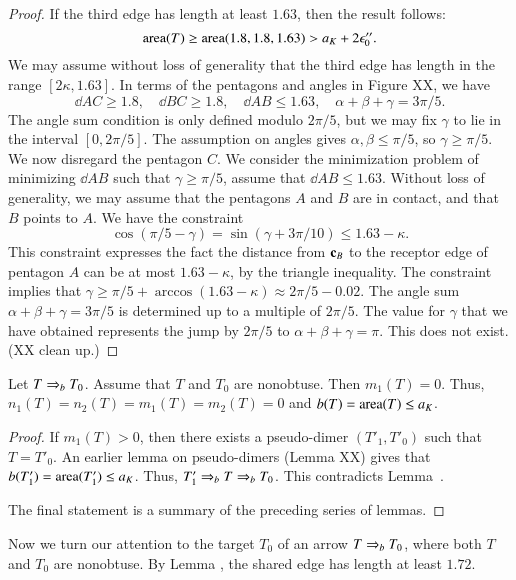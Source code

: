 \begin{proof}  If the third edge has length at least $1.63$, then the result follows:
\[
{\operatorname{area}}(T) \ge {\operatorname{area}}(1.8,1.8,1.63) > a_K + 2\epsilon_0''.
\]
We may assume without loss of generality that the third edge has length in the range $[2\kappa,1.63]$.
In terms of the pentagons and angles in Figure XX, we have
\[
\dd{A}{C}\ge 1.8,\quad \dd{B}{C}\ge 1.8,\quad \dd{A}{B}\le 1.63,\quad \alpha+\beta+\gamma=3\pi/5.
\]
The angle sum condition is only defined modulo $2\pi/5$, but we may fix $\gamma$ to lie in the
interval $[0,2\pi/5]$.
The assumption on angles gives $\alpha,\beta\le \pi/5$, so $\gamma\ge \pi/5$.
We now disregard the pentagon $C$.  We consider the minimization problem of minimizing $\dd{A}{B}$ such that
$\gamma\ge\pi/5$, assume that $\dd{A}{B}\le 1.63$.  Without loss of generality, we may assume that the
pentagons $A$ and $B$ are in contact, and that $B$ points to $A$.
We have the constraint
\[
\cos(\pi/5 - \gamma) =\sin(\gamma+3\pi/10) \le 1.63 - \kappa.
\]
This constraint expresses the fact the distance from ${\mathbf c}_B$ to the  receptor edge of pentagon $A$  can be at
most $1.63-\kappa$, by the triangle inequality.  The constraint implies that
$\gamma \ge \pi/5 + \arccos (1.63-\kappa) \approx 2\pi/5 - 0.02$.
The angle sum $\alpha+\beta+\gamma=3\pi/5$ is determined up to a multiple of $2\pi/5$.  The value
for $\gamma$ that we have obtained represents the jump by $2\pi/5$ to $\alpha+\beta+\gamma=\pi$.
This does not exist. (XX clean up.)
\end{proof}

\begin{lemma} Let $T\Rightarrow_{b} T_0$. Assume that $T$ and $T_0$ are nonobtuse.
Then $m_1(T)=0$.  Thus, $n_1(T)=n_2(T)=m_1(T)=m_2(T)=0$ and $b(T)={\operatorname{area}}(T)\le a_K$.
\end{lemma}

\begin{proof}
If $m_1(T)>0$, then there exists a pseudo-dimer $(T'_1,T'_0)$ such that $T=T'_0$.
An earlier lemma on pseudo-dimers (Lemma XX) gives that $b(T'_1)={\operatorname{area}}(T'_1)\le a_K$.
Thus, $T'_1\Rightarrow_{b} T\Rightarrow_{b} T_0$.  This contradicts Lemma~.

The final statement is a summary of the preceding series of lemmas.
\end{proof}

Now we turn our attention to the target $T_0$ of an arrow $T\Rightarrow_{b} T_0$, where both
$T$ and $T_0$ are nonobtuse.  By Lemma , the shared edge
has length at least $1.72$.

